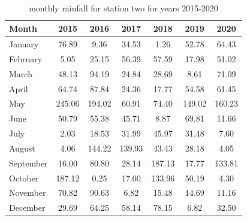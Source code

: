 \documentclass[12pt]{article}
\theoremstyle{definition}
\begin{document}
\\
\begin{table}[ht]
  \centering
  \caption{monthly rainfall for station two for years 2015-2020}
  \label{tab:station2}
  \begin{tabular}{l *{6}{S[table-format=3.2]}}
    \toprule
    \textbf{Month} & \textbf{2015} & \textbf{2016} & \textbf{2017} & \textbf{2018} & \textbf{2019} & \textbf{2020} \\
    \midrule
    January  & 76.89 &  9.36 & 34.53 &  1.26 & 52.78 & 64.43 \\
    February &  5.05 & 25.15 & 56.39 & 57.59 & 17.98 & 51.02 \\
    March    & 48.13 & 94.19 & 24.84 & 28.69 &  8.61 & 71.09 \\
    April    & 64.74 & 87.84 & 24.36 & 17.77 & 54.58 & 61.45 \\
    May      &245.06 &194.02 & 60.91 & 74.40 &149.02 &160.23 \\
    June     & 50.79 & 55.38 & 45.71 &  8.87 & 69.81 & 11.66 \\
    July     &  2.03 & 18.53 & 31.99 & 45.97 & 31.48 &  7.60 \\
    August   &  4.06 &144.22 &139.93 & 43.43 & 28.18 &  4.05 \\
    September& 16.00 & 80.80 & 28.14 &187.13 & 17.77 &133.81 \\
    October  &187.12 &  0.25 & 17.00 &133.96 & 50.19 &  4.30 \\
    November & 70.82 & 90.63 &  6.82 & 15.48 & 14.69 & 11.16 \\
    December & 29.69 & 64.25 & 58.14 & 78.15 &  6.82 & 32.50 \\
    \bottomrule
  \end{tabular}
\end{table}
\\
\end{document}
